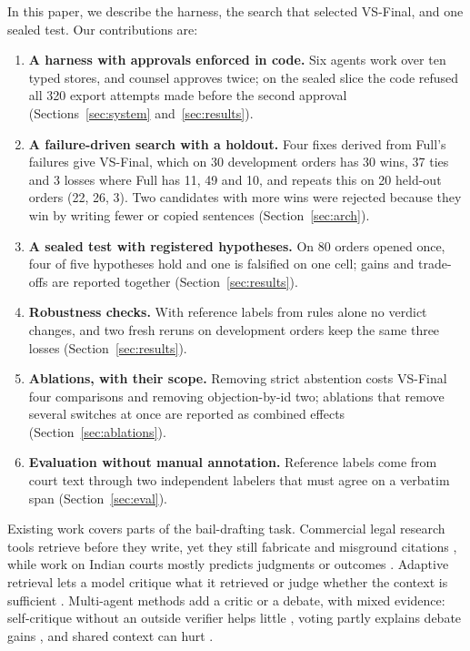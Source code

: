 \documentclass[11pt]{article}
\makeatletter
\newcommand{\vs}{VS-Final}
\def\section{\@startsection {section}{1}{\z@}{-2.0ex plus
    -0.5ex minus -.2ex}{1.5ex plus 0.3ex minus .2ex}{\large\bfseries\raggedright\color{vsblue}}}
\makeatother
\begin{document}
In this paper, we describe the harness, the search that selected \vs{}, and one sealed test. Our contributions are:
\begin{enumerate}[label=(\arabic*),leftmargin=*,itemsep=1pt,topsep=3pt]
\item \textbf{A harness with approvals enforced in code.} Six agents work over ten typed stores, and counsel approves twice; on the sealed slice the code refused all 320 export attempts made before the second approval (Sections~\ref{sec:system} and~\ref{sec:results}).
\item \textbf{A failure-driven search with a holdout.} Four fixes derived from Full's failures give \vs{}, which on 30 development orders has 30 wins, 37 ties and 3 losses where Full has 11, 49 and 10, and repeats this on 20 held-out orders (22, 26, 3). Two candidates with more wins were rejected because they win by writing fewer or copied sentences (Section~\ref{sec:arch}).
\item \textbf{A sealed test with registered hypotheses.} On 80 orders opened once, four of five hypotheses hold and one is falsified on one cell; gains and trade-offs are reported together (Section~\ref{sec:results}).
\item \textbf{Robustness checks.} With reference labels from rules alone no verdict changes, and two fresh reruns on development orders keep the same three losses (Section~\ref{sec:results}).
\item \textbf{Ablations, with their scope.} Removing strict abstention costs \vs{} four comparisons and removing objection-by-id two; ablations that remove several switches at once are reported as combined effects (Section~\ref{sec:ablations}).
\item \textbf{Evaluation without manual annotation.} Reference labels come from court text through two independent labelers that must agree on a verbatim span (Section~\ref{sec:eval}).
\end{enumerate}

\section{Literature Review}
\label{sec:lit}

Existing work covers parts of the bail-drafting task. Commercial legal research tools retrieve before they write, yet they still fabricate and misground citations \citep{magesh2025}, while work on Indian courts mostly predicts judgments or outcomes \citep{nigam2025nyayarag,nigam2024predex}. Adaptive retrieval lets a model critique what it retrieved or judge whether the context is sufficient \citep{asai2024selfrag,yan2024crag,jeong2024adaptive,joren2025sufficient}. Multi-agent methods add a critic or a debate, with mixed evidence: self-critique without an outside verifier helps little \citep{gou2024critic,huang2024selfcorrect}, voting partly explains debate gains \citep{choi2025debate}, and shared context can hurt \citep{wynn2025talk}.
\end{document}
